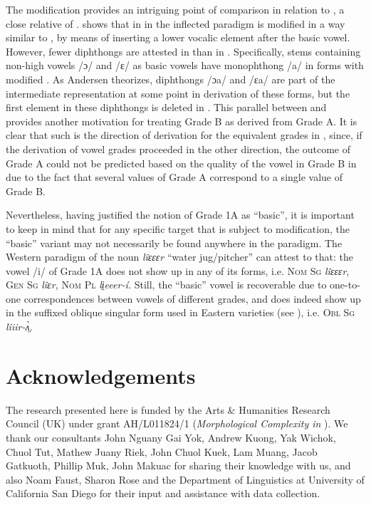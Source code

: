 \documentclass[output=paper,newtxmath,modfonts,nonflat,draftmode]{langsci/langscibook}
\begin{document}
The  modification provides an intriguing point of comparison in relation to , a close relative of . \citet{Andersen1993} shows that in   in the inflected paradigm is modified in a way similar to , by means of inserting a lower vocalic element after the basic vowel. However, fewer diphthongs are attested in  than in . Specifically, stems containing non-high vowels /ɔ/ and /ɛ/ as basic vowels have monophthong /a/ in forms with modified . As Andersen theorizes, diphthongs /ɔa/ and /ɛa/ are part of the intermediate representation at some point in derivation of these forms, but the first element in these diphthongs is deleted in . This parallel between  and  provides another motivation for treating Grade B as derived from Grade A. It is clear that such is the direction of derivation for the equivalent grades in , since, if the derivation of vowel grades proceeded in the other direction, the outcome of Grade A could not be predicted based on the quality of the vowel in Grade B in  due to the fact that several values of Grade A correspond to a single value of Grade B. 

Nevertheless, having justified the notion of Grade 1A as “basic”, it is important to keep in mind that for any specific target that is {subject} to modification, the “basic” variant may not necessarily be found anywhere in the paradigm. The Western  paradigm of the noun \textit{lîɛɛɛr} “water jug/pitcher” can attest to that: the vowel /i/ of Grade 1A does not show up in any of its forms, i.e. \textsc{Nom Sg} \textit{lîɛɛɛr}, \textsc{Gen Sg} \textit{lîɛr,} \textsc{Nom Pl} \textit{li̤eeer-í.} Still, the “basic” vowel is recoverable due to one-to-one correspondences between vowels of different grades, and does indeed show up in the suffixed oblique singular form used in Eastern  varieties (see ), i.e. \textsc{Obl Sg} \textit{lîiir-ʌ̤̀}.


\section*{Acknowledgements}

The research presented here is funded by the Arts \& Humanities Research Council (UK) under grant AH/L011824/1 (\textit{Morphological Complexity in }). We thank our  consultants John Nguany Gai Yok, Andrew Kuong, Yak Wichok, Chuol Tut, Mathew Juany Riek, John Chuol Kuek, Lam Muang, 
Jacob Gatkuoth, 
Phillip Muk, 
John Makuac for sharing their knowledge with us, and also Noam Faust, Sharon Rose and the Department of Linguistics at University of California San Diego for their input and assistance with data collection.
\end{document}

